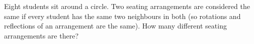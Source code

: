 Eight students sit around a circle. Two seating arrangements are considered the same if every student has the same two neighbours in both (so rotations and reflections of an arrangement are the same). How many different seating arrangements are there?
